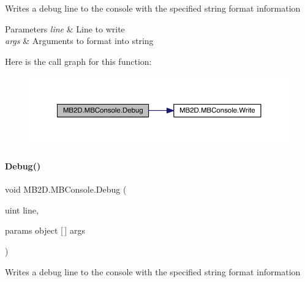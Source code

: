 Writes a debug line to the console with the specified string format information 


\begin{DoxyParams}{Parameters}
{\em line} & Line to write\\
\hline
{\em args} & Arguments to format into string\\
\hline
\end{DoxyParams}
Here is the call graph for this function\+:
\nopagebreak
\begin{figure}[H]
\begin{center}
\leavevmode
\includegraphics[width=350pt]{class_m_b2_d_1_1_m_b_console_a1235820bedb1bc0598c863a0d7033329_cgraph}
\end{center}
\end{figure}
\hypertarget{class_m_b2_d_1_1_m_b_console_aef53935b8ae3c6cd2b87a81e5dbcdf1e}{}\label{class_m_b2_d_1_1_m_b_console_aef53935b8ae3c6cd2b87a81e5dbcdf1e} 
\paragraph{\texorpdfstring{Debug()}{Debug()}\hspace{0.1cm}{\footnotesize\ttfamily [3/4]}}
{\footnotesize\ttfamily void M\+B2\+D.\+M\+B\+Console.\+Debug (\begin{DoxyParamCaption}\item[{uint}]{line,  }\item[{params object \mbox{[}$\,$\mbox{]}}]{args }\end{DoxyParamCaption})\hspace{0.3cm}{\ttfamily [inline]}}



Writes a debug line to the console with the specified string format information 



